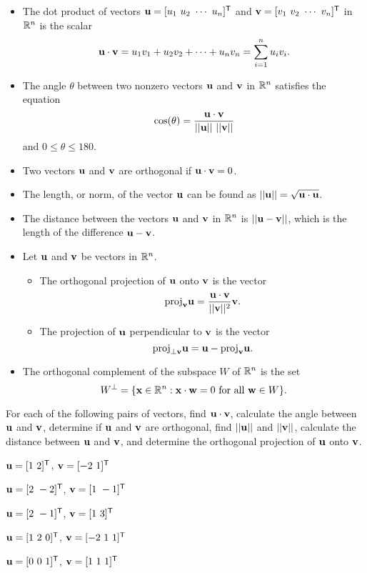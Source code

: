 \label{sec:dot_prod_summ}
\begin{itemize}
\item The dot product of vectors $\mathbf{u} = [u_1 \ u_2 \  \cdots  \ u_n ]^{\mathsf{T}}$ and $\mathbf{v} = [ v_1 \ v_2 \ \cdots \ v_n ]^{\mathsf{T}}$ in $\mathbb{R}^n$ is the scalar 
\[\mathbf{u} \cdot \mathbf{v} = u_1v_1 + u_2v_2 + \cdots + u_nv_n = \displaystyle \sum_{i=1}^n u_iv_i.\]
\item The angle $\theta$ between two nonzero vectors $\mathbf{u}$ and $\mathbf{v}$ in $\mathbb{R}^n$ satisfies the equation
\[\cos(\theta) = \frac{\vu \cdot \vv}{||\vu|| \ ||\vv||}\]
and $0\leq \theta \leq 180$.
\item Two vectors $\mathbf{u}$ and $\mathbf{v}$ are orthogonal if $\mathbf{u} \cdot \mathbf{v} = 0$. 
\item The length, or norm, of the vector $\mathbf{u}$ can be found as $\displaystyle || \mathbf{u} || = \sqrt{\mathbf{u} \cdot \mathbf{u}}$.
\item The distance between the vectors $\mathbf{u}$ and $\mathbf{v}$ in $\mathbb{R}^n$ is $||\mathbf{u} - \mathbf{v} ||$, which is the length of the difference $\mathbf{u} - \mathbf{v}$.
\item Let $\mathbf{u}$ and $\mathbf{v}$ be vectors in $\mathbb{R}^n$. 
	\begin{itemize}
	\item The orthogonal projection of $\mathbf{u}$ onto $\mathbf{v}$ is the vector 
	\[\text{proj}_{\mathbf{v}} \mathbf{u} = \frac{\mathbf{u} \cdot \mathbf{v}}{||\mathbf{v}||^2} \mathbf{v}.\]
	\item The projection of $\mathbf{u}$ perpendicular to $\mathbf{v}$ is the vector 
	\[\text{proj}_{\perp \mathbf{v}} \mathbf{u} = \mathbf{u} - \text{proj}_{\mathbf{v}} \mathbf{u}.\]
	\end{itemize}
\item The orthogonal complement of the subspace $W$ of $\mathbb{R}^n$ is the set 
\[W^{\perp} = \{\mathbf{x} \in \mathbb{R}^n : \mathbf{x} \cdot \mathbf{w} = 0 \text{ for all } \mathbf{w} \in W\}.\]
\end{itemize}



\label{sec:dot_prod_exer}
\be
\item For each of the following pairs of vectors, find $\mathbf{u} \cdot \mathbf{v}$, calculate the angle between $\mathbf{u}$ and $\mathbf{v}$, determine if $\mathbf{u}$ and $\mathbf{v}$ are orthogonal, find $||\mathbf{u}||$ and $||\mathbf{v}||$, calculate the distance between $\mathbf{u}$ and $\mathbf{v}$, and determine the orthogonal  projection of $\mathbf{u}$ onto $\mathbf{v}$. 
	\ba
	\item $\mathbf{u} = [1 \ 2]^{\mathsf{T}}$, $\mathbf{v} = [-2 \ 1]^{\mathsf{T}}$
	\item $\mathbf{u} = [2 \ -2]^{\mathsf{T}}$, $\mathbf{v} = [1 \ -1]^{\mathsf{T}}$
	\item $\mathbf{u} = [2 \ -1]^{\mathsf{T}}$, $\mathbf{v} = [1 \ 3]^{\mathsf{T}}$
	\item $\mathbf{u} = [1 \ 2 \ 0]^{\mathsf{T}}$, $\mathbf{v} = [-2 \ 1 \ 1]^{\mathsf{T}}$
	\item $\mathbf{u} = [0 \ 0 \ 1]^{\mathsf{T}}$, $\mathbf{v} = [1 \ 1 \ 1]^{\mathsf{T}}$
	\ea


